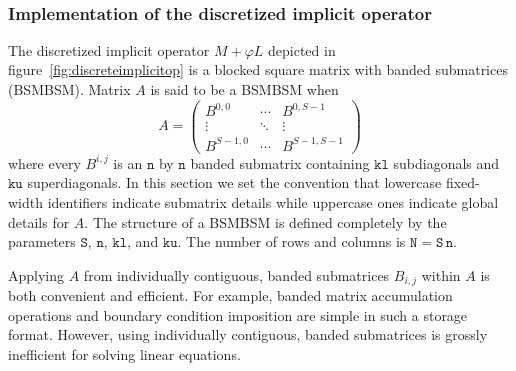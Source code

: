 \documentclass[letterpaper,11pt,nointlimits,reqno,draft]{amsart}
\newcommand{\trans}[1]{{#1}^{\ensuremath{\mathsf{T}}}}
\begin{document}
\begin{sidewaysfigure}
\\
 \caption[The discrete operator $M+\varphi{}L$ used for implicit time advance]{
The complete discrete operator $M+\varphi{}L$ used for implicit time advance is
depicted.  Notice the leftmost scalar factor $\bm{\vp}$.  The $3 N_y \times
N_y$ blocked vectors surrounded by curly braces are to be ``dotted'' against
the blocked vector $
  \trans{\begin{bmatrix} \M & \D{1} & \D{2} \end{bmatrix}}
$ to form $N_y \times N_y$ subblocks.  Each of $M$, $\D{1}$, and $\D{2}$ is a
$N_y \times N_y$ banded matrix.  Reference quantities like $C^\nu$ are $N_y
\times N_y$ diagonal matrices.  The wavenumber-dependent operator takes
wall-normal B-spline coefficients to B-spline collocation point values.
 }
\label{fig:discreteimplicitop}
\end{sidewaysfigure}

\subsubsection{Implementation of the discretized implicit operator}

The discretized implicit operator $M+\varphi{}L$ depicted in
figure~\ref{fig:discreteimplicitop} is a blocked square matrix with banded
submatrices (BSMBSM).  Matrix $A$ is said to be a BSMBSM when
\[A = \begin{pmatrix}
    B^{0,0}  & \cdots & B^{0,S-1}   \\
    \vdots    & \ddots & \vdots       \\
    B^{S-1,0} & \cdots & B^{S-1,S-1}
\end{pmatrix}\]
where every $B^{i,j}$ is an $\mathtt{n}$ by $\mathtt{n}$ banded submatrix
containing $\mathtt{kl}$ subdiagonals and $\mathtt{ku}$ superdiagonals.  In
this section we set the convention that lowercase fixed-width identifiers
indicate submatrix details while uppercase ones indicate global details for
$A$.  The structure of a BSMBSM is defined completely by the parameters
$\mathtt{S}$, $\mathtt{n}$, $\mathtt{kl}$, and $\mathtt{ku}$.  The number of
rows and columns is $\mathtt{N} = \mathtt{S}\,\mathtt{n}$.

Applying $A$ from individually contiguous, banded submatrices $B_{i,j}$ within
$A$ is both convenient and efficient.  For example, banded matrix accumulation
operations and boundary condition imposition are simple in such a storage
format.  However, using individually contiguous, banded submatrices is grossly
inefficient for solving linear equations.
\end{document}
